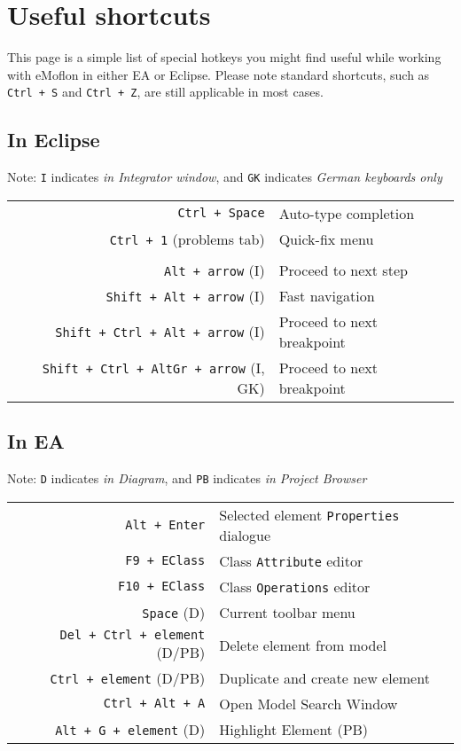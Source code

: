 \newpage
\section{Useful shortcuts}
\genHeader

This page is a simple list of special hotkeys you might find useful while working with eMoflon in either EA or Eclipse. Please note standard
shortcuts, such as \texttt{Ctrl + S} and \texttt{Ctrl + Z}, are still applicable in most cases.

\subsection{In Eclipse}

{\small Note: \texttt{I} indicates \emph{in Integrator window}, and \texttt{GK} indicates \emph{German keyboards only}}

\begin{tabular}{r|l}

\texttt{Ctrl + Space} & Auto-type completion\\
\texttt{Ctrl + 1} (problems tab) & Quick-fix menu \\
\\
\texttt{Alt + arrow} (I) & Proceed to next step \\
\texttt{Shift + Alt + arrow} (I) & Fast navigation \\
\texttt{Shift + Ctrl + Alt + arrow} (I) & Proceed to next breakpoint \\
\texttt{Shift + Ctrl + AltGr + arrow} (I, GK) & Proceed to next breakpoint \\
%
\end{tabular}

\vspace{0.5cm}

\subsection{In EA}

{\small Note: \texttt{D} indicates \emph{in Diagram}, and \texttt{PB} indicates \emph{in Project Browser}}

\begin{tabular}{r|l}
\texttt{Alt + Enter} & Selected element \texttt{Properties} dialogue \\
\texttt{F9 + EClass} & Class \texttt{Attribute} editor \\
\texttt{F10 + EClass} & Class \texttt{Operations} editor \\
\texttt{Space} (D) & Current toolbar menu \\
\texttt{Del + Ctrl + element} (D/PB) & Delete element from model\\
\texttt{Ctrl + element} (D/PB) & Duplicate and create new element \\
\texttt{Ctrl + Alt + A} & Open Model Search Window \\
\texttt{Alt + G + element} (D) & Highlight Element (PB) \\
%
\end{tabular}

